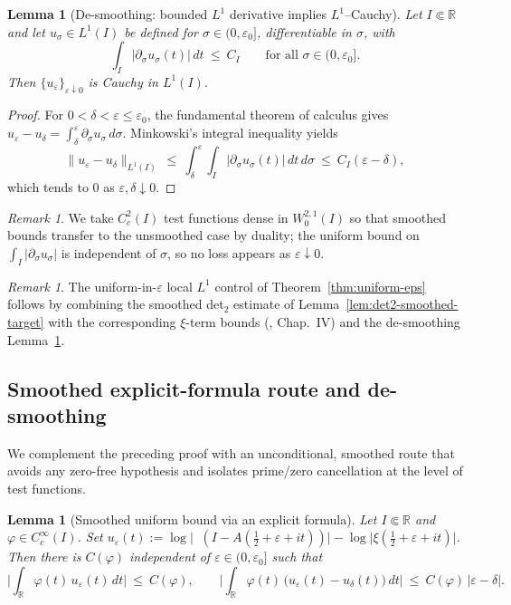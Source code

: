 \documentclass[11pt]{article}
\newtheorem{lemma}[theorem]{Lemma}
\theoremstyle{definition}
\theoremstyle{remark}
\newtheorem{remark}[theorem]{Remark}
\newcommand{\R}{\mathbb{R}}
\DeclareMathOperator{\dettwo}{det_2}
\begin{document}
\begin{lemma}[De-smoothing: bounded $L^1$ derivative implies $L^1$–Cauchy]\label{lem:desmoothing}
Let \(I\Subset\R\) and let \(u_\sigma\in L^1(I)\) be defined for \(\sigma\in(0,\varepsilon_0]\), differentiable in \(\sigma\), with
\[
  \int_I |\partial_\sigma u_\sigma(t)|\,dt\ \le\ C_I\qquad\text{for all }\sigma\in(0,\varepsilon_0].
\]
Then \(\{u_\varepsilon\}_{\varepsilon\downarrow 0}\) is Cauchy in $L^1(I)$.
\end{lemma}
\begin{proof}
For \(0<\delta<\varepsilon\le\varepsilon_0\), the fundamental theorem of calculus gives
\(u_\varepsilon-u_\delta=\int_\delta^\varepsilon \partial_\sigma u_\sigma\,d\sigma\).
Minkowski's integral inequality yields
\[
  \|u_\varepsilon-u_\delta\|_{L^1(I)}\ \le\ \int_\delta^\varepsilon \int_I |\partial_\sigma u_\sigma(t)|\,dt\,d\sigma\ \le\ C_I(\varepsilon-\delta),
\]
which tends to $0$ as \(\varepsilon,\delta\downarrow 0\).
\end{proof}
\begin{remark}
We take \(C_c^2(I)\) test functions dense in \(W^{2,1}_0(I)\) so that smoothed bounds transfer to the unsmoothed case by duality; the uniform bound on \(\int_I|\partial_\sigma u_\sigma|\) is independent of \(\sigma\), so no loss appears as \(\varepsilon\downarrow 0\).
\end{remark}

\begin{remark}
The uniform-in-\(\varepsilon\) local $L^1$ control of Theorem~\ref{thm:uniform-eps} follows by combining the smoothed det$_2$ estimate of Lemma~\ref{lem:det2-smoothed-target} with the corresponding \(\xi\)-term bounds (\cite{TitchmarshZeta}, Chap.~IV) and the de-smoothing Lemma~\ref{lem:desmoothing}.
\end{remark}

\subsection{Smoothed explicit-formula route and de-smoothing}\label{subsec:smoothed-explicit}
We complement the preceding proof with an unconditional, smoothed route that avoids any zero-free hypothesis and isolates prime/zero cancellation at the level of test functions.

\begin{lemma}[Smoothed uniform bound via an explicit formula]\label{lem:smoothed-explicit}
Let \(I\Subset\R\) and \(\varphi\in C_c^{\infty}(I)\). Set \(u_\varepsilon(t):=\log\big|\dettwo(I-A(\tfrac12+\varepsilon+it))\big|-\log\big|\xi(\tfrac12+\varepsilon+it)\big|\). Then there is \(C(\varphi)\) independent of \(\varepsilon\in(0,\varepsilon_0]\) such that
\[
 \Big|\int_{\R} \varphi(t)\,u_\varepsilon(t)\,dt\Big|\ \le\ C(\varphi),\qquad \Big|\int_{\R} \varphi(t)\,\big(u_\varepsilon(t)-u_\delta(t)\big)\,dt\Big|\ \le\ C(\varphi)\,|\varepsilon-\delta|.
\]
\end{lemma}
\end{document}

